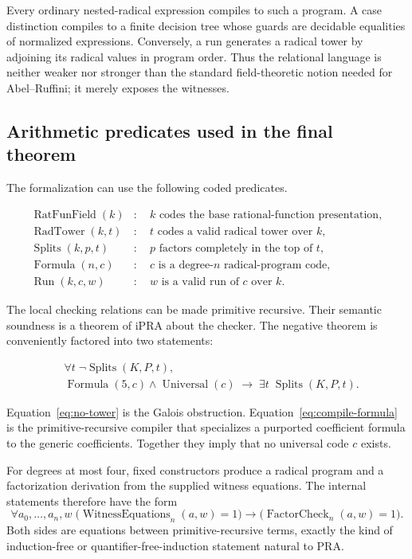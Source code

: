 Every ordinary nested-radical expression compiles to such a program.  A case
distinction compiles to a finite decision tree whose guards are decidable
equalities of normalized expressions.  Conversely, a run generates a radical
tower by adjoining its radical values in program order.  Thus the relational
language is neither weaker nor stronger than the standard field-theoretic
notion needed for Abel--Ruffini; it merely exposes the witnesses.

\subsection{Arithmetic predicates used in the final theorem}

The formalization can use the following coded predicates.

\begin{align*}
 \operatorname{RatFunField}(k) &:\quad k\text{ codes the base rational-function presentation},\\
 \operatorname{RadTower}(k,t) &:\quad t\text{ codes a valid radical tower over }k,\\
 \operatorname{Splits}(k,p,t) &:\quad p\text{ factors completely in the top of }t,\\
 \operatorname{Formula}(n,c) &:\quad c\text{ is a degree-}n\text{ radical-program code},\\
 \operatorname{Run}(k,c,w) &:\quad w\text{ is a valid run of }c\text{ over }k.
\end{align*}

The local checking relations can be made primitive recursive.  Their semantic
soundness is a theorem of iPRA about the checker.  The negative theorem is
conveniently factored into two statements:

\begin{align}
 &\forall t\;\neg\operatorname{Splits}(K,P,t),
 \label{eq:no-tower}\\
 &\operatorname{Formula}(5,c)\land\operatorname{Universal}(c)
 \;\longrightarrow\;
   \exists t\;\operatorname{Splits}(K,P,t).
 \label{eq:compile-formula}
\end{align}

Equation~\eqref{eq:no-tower} is the Galois obstruction.
Equation~\eqref{eq:compile-formula} is the primitive-recursive compiler that
specializes a purported coefficient formula to the generic coefficients.
Together they imply that no universal code $c$ exists.

For degrees at most four, fixed constructors produce a radical program and a
factorization derivation from the supplied witness equations.  The internal
statements therefore have the form
\[
 \forall a_0,\ldots,a_n,w\;
   \bigl(\operatorname{WitnessEquations}_n(a,w)=1\bigr)
   \to
   \bigl(\operatorname{FactorCheck}_n(a,w)=1\bigr).
\]
Both sides are equations between primitive-recursive terms, exactly the kind
of induction-free or quantifier-free-induction statement natural to PRA.

